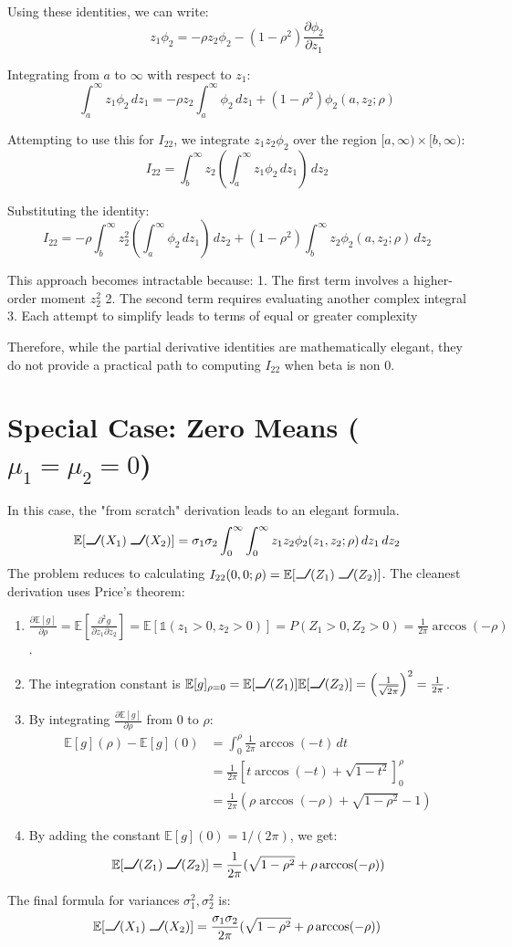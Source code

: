 \documentclass[a4paper]{article}
\DeclareRobustCommand{\ReLU}{\mathrel{\text{%
    \begin{tikzpicture}[baseline=(current bounding box.south)]
        \draw[thick] (0,0) -- (0.25,0) -- (0.4,0.25);
    \end{tikzpicture}}}\!\!}
\newcommand{\E}{\mathbb{E}}
\newcommand{\indic}{\mathbb{1}}
\newcommand{\dd}{\,d}
\begin{document}
Using these identities, we can write:
\[
z_1\phi_2 = -\rho z_2\phi_2 - (1-\rho^2)\frac{\partial \phi_2}{\partial z_1}
\]

Integrating from $a$ to $\infty$ with respect to $z_1$:
\[
\int_a^\infty z_1\phi_2 \dd z_1 = -\rho z_2\int_a^\infty \phi_2 \dd z_1 + (1-\rho^2)\phi_2(a, z_2; \rho)
\]

Attempting to use this for $I_{22}$, we integrate $z_1z_2\phi_2$ over the region $[a,\infty) \times [b,\infty)$:
\[
I_{22} = \int_b^\infty z_2 \left(\int_a^\infty z_1\phi_2 \dd z_1\right) \dd z_2
\]

Substituting the identity:
\[
I_{22} = -\rho \int_b^\infty z_2^2 \left(\int_a^\infty \phi_2 \dd z_1\right) \dd z_2 + (1-\rho^2)\int_b^\infty z_2\phi_2(a, z_2; \rho) \dd z_2
\]

This approach becomes intractable because:
1. The first term involves a higher-order moment $z_2^2$
2. The second term requires evaluating another complex integral
3. Each attempt to simplify leads to terms of equal or greater complexity

Therefore, while the partial derivative identities are mathematically elegant, they do not provide a practical path to computing $I_{22}$ when beta is non 0.
\newpage
\section{Special Case: Zero Means ($\mu_1=\mu_2=0$)}
In this case, the "from scratch" derivation leads to an elegant formula.
\[
\E[\ReLU(X_1)\ReLU(X_2)] = \sigma_1\sigma_2 \int_0^\infty \int_0^\infty z_1 z_2 \phi_2(z_1, z_2; \rho) \dd z_1 \dd z_2
\]
The problem reduces to calculating $I_{22}(0,0; \rho) = \E[\ReLU(Z_1)\ReLU(Z_2)]$. The cleanest derivation uses Price's theorem:
\begin{enumerate}
    \item $\frac{\partial \E[g]}{\partial \rho} = \E\left[\frac{\partial^2 g}{\partial z_1 \partial z_2}\right] = \E[\indic(z_1>0, z_2>0)] = P(Z_1>0, Z_2>0) = \frac{1}{2\pi}\arccos(-\rho)$.
    \item The integration constant is $\E[g]_{\rho=0} = \E[\ReLU(Z_1)]\E[\ReLU(Z_2)] = \left(\frac{1}{\sqrt{2\pi}}\right)^2 = \frac{1}{2\pi}$.
    \item By integrating $\frac{\partial \E[g]}{\partial \rho}$ from $0$ to $\rho$:
    \begin{align*}
        \E[g](\rho) - \E[g](0) &= \int_0^\rho \frac{1}{2\pi}\arccos(-t) \dd t \\
        &= \frac{1}{2\pi} \left[ t\arccos(-t) + \sqrt{1-t^2} \right]_0^\rho \\
        &= \frac{1}{2\pi} (\rho\arccos(-\rho) + \sqrt{1-\rho^2} - 1)
    \end{align*}
    \item By adding the constant $\E[g](0) = 1/(2\pi)$, we get:
    \[
    \E[\ReLU(Z_1)\ReLU(Z_2)] = \frac{1}{2\pi}(\sqrt{1-\rho^2} + \rho\arccos(-\rho))
    \]
\end{enumerate}
The final formula for variances $\sigma_1^2, \sigma_2^2$ is:
\[
\E[\ReLU(X_1)\ReLU(X_2)] = \frac{\sigma_1\sigma_2}{2\pi}(\sqrt{1-\rho^2} + \rho\arccos(-\rho))
\]
\end{document}
